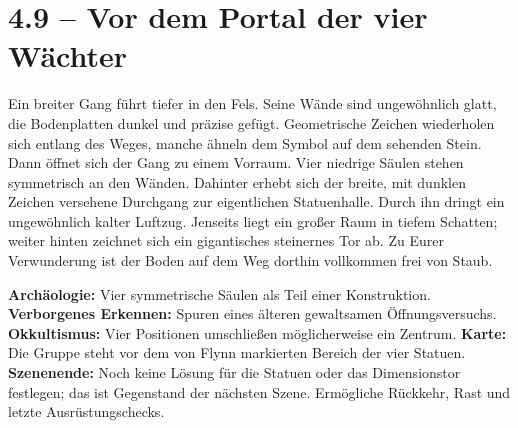\section{4.9 -- Vor dem Portal der vier Wächter}
\begin{vorlesetextalle}
Ein breiter Gang führt tiefer in den Fels. Seine Wände sind ungewöhnlich glatt, die Bodenplatten dunkel und präzise gefügt. Geometrische Zeichen wiederholen sich entlang des Weges, manche ähneln dem Symbol auf dem sehenden Stein. Dann öffnet sich der Gang zu einem Vorraum. Vier niedrige Säulen stehen symmetrisch an den Wänden. Dahinter erhebt sich der breite, mit dunklen Zeichen versehene Durchgang zur eigentlichen Statuenhalle. Durch ihn dringt ein ungewöhnlich kalter Luftzug. Jenseits liegt ein gro\ss{}er Raum in tiefem Schatten; weiter hinten zeichnet sich ein gigantisches steinernes Tor ab. Zu Eurer Verwunderung ist der Boden auf dem Weg dorthin vollkommen frei von Staub.
\end{vorlesetextalle}
\begin{meisterinfo}
\textbf{Archäologie:} Vier symmetrische Säulen als Teil einer Konstruktion. \textbf{Verborgenes Erkennen:} Spuren eines älteren gewaltsamen Öffnungsversuchs. \textbf{Okkultismus:} Vier Positionen umschlie\ss{}en möglicherweise ein Zentrum. \textbf{Karte:} Die Gruppe steht vor dem von Flynn markierten Bereich der vier Statuen. \textbf{Szenenende:} Noch keine Lösung für die Statuen oder das Dimensionstor festlegen; das ist Gegenstand der nächsten Szene. Ermögliche Rückkehr, Rast und letzte Ausrüstungschecks.
\end{meisterinfo}
